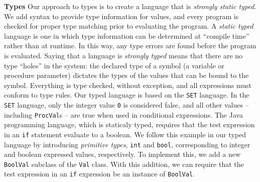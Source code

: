 \begin{minipage}[t]{\sw}
\slidenumber
\LARGE
{\bf Types}\exx
Our approach to types is to create a language that is
{\em strongly static typed}.
We add syntax to provide type information for values,
and every program is checked
for proper type matching prior
to evaluating the program.\exx
A {\em static typed} language is one in which type information 
can be determined at ``compile time'' rather than at runtime.
In this way, any type errors are found
before the program is evaluated.
Saying that a language is {\em strongly typed}
means that there are no type ``holes'' in the system:
the declared type of a symbol
(a variable or procedure parameter)
dictates the types of the values that can be bound to the symbol.
Everything is type checked, without exception,
and all expressions must conform to type rules.\exx
Our typed language is based on the \verb'SET' language.
In the \verb'SET' language,
only the integer value \verb'0' is considered false,
and all other values -- including \verb'ProcVal's -- are true
when used in conditional expressions.
The Java programming language, which is staticaly typed,
requires that the test expression
in an \verb'if' statement evaluate to a boolean.
We follow this example in our typed language
by introducing {\em primitive types}, \verb'int' and \verb'bool',
corresponding to integer and boolean expressed values, respectively.
To implement this, we add a new \verb'BoolVal' subclass
of the \verb'Val' class.
With this addition, we can require that the test expression
in an \verb'if' expression be an instance of \verb'BoolVal'.\exx
\end{minipage}
